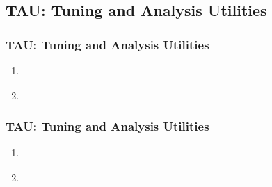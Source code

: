 \subsection{TAU: Tuning and Analysis Utilities}

\newcommand{\asuivre}{\setcounter{sauvegardeenumi}{\theenumi}}
\newcommand{\suite}{\setcounter{enumi}{\thesauvegardeenumi}}

\begin{frame}\frametitle{TAU: Tuning and Analysis Utilities}
\begin{enumerate}
	\item \href{https://www.cs.uoregon.edu/research/paracomp/papers/ijhpca05.tau/ijhpca_tau.pdf}{}
	\item \href{http://www.cs.uoregon.edu/research/paracomp/papers/sc2000/sc00-paper.fmk.pdf.gz}{}
	\asuivre
\end{enumerate}
\end{frame}
\begin{frame}\frametitle{TAU: Tuning and Analysis Utilities}
\begin{enumerate}
	\suite
	\item \href{https://www.cs.uoregon.edu/research/paracomp/papers/cca_cpe04/cca_cpe04.pdf}{}
	\item \href{https://www.cs.uoregon.edu/research/paracomp/papers/ijhpca05.cca/ijhpca06.pdf}{}
\end{enumerate}
\end{frame}

